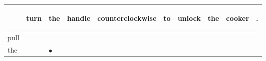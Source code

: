 \documentclass[landscape]{article}
\newcommand{\ssp}{\hspace{2pt}}
\newcommand{\mex}{\cellcolor{g}$\bullet$}
\begin{document}
\noindent\begin{tabular}{|l|p{10pt}|p{10pt}|p{10pt}|p{10pt}|p{10pt}|p{10pt}|p{10pt}|p{10pt}|p{10pt}|}
\hline
&\begin{sideways}\cellcolor{ref0}turn\hspace{12pt}\end{sideways}&\begin{sideways}\cellcolor{ref1}the\hspace{12pt}\end{sideways}&\begin{sideways}\cellcolor{ref2}handle\hspace{12pt}\end{sideways}&\begin{sideways}\cellcolor{ref3}counterclockwise\hspace{12pt}\end{sideways}&\begin{sideways}\cellcolor{ref4}to\hspace{12pt}\end{sideways}&\begin{sideways}\cellcolor{ref5}unlock\hspace{12pt}\end{sideways}&\begin{sideways}\cellcolor{ref6}the\hspace{12pt}\end{sideways}&\begin{sideways}\cellcolor{ref7}cooker\hspace{12pt}\end{sideways}&\begin{sideways}\cellcolor{ref8}.\hspace{12pt}\end{sideways}\\
\hline
\ssp pull \ssp&\hspace{2pt}&\hspace{2pt}&\hspace{2pt}&\hspace{2pt}&\hspace{2pt}&\hspace{2pt}&\hspace{2pt}&\hspace{2pt}&\hspace{2pt}\\
\hline
\ssp \cellcolor{ref1}the \ssp&\hspace{2pt}&\hspace{2pt}\mex&\hspace{2pt}&\hspace{2pt}&\hspace{2pt}&\hspace{2pt}&\hspace{2pt}&\hspace{2pt}&\hspace{2pt}\\

\end{tabular}
\end{document}
